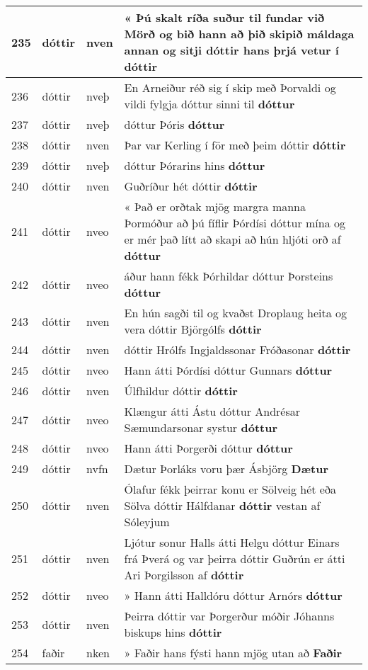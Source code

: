 \documentclass{article}
\begin{document}
\begin{longtable}{p{1cm}|p{1cm}|p{1cm}|p{13cm}}
\hline
235&dóttir&nven&« Þú skalt ríða suður til fundar við Mörð og bið hann að þið skipið máldaga annan og sitji dóttir hans þrjá vetur í \textbf{dóttir} \\
\hline
236&dóttir&nveþ&En Arneiður réð sig í skip með Þorvaldi og vildi fylgja dóttur sinni til \textbf{dóttur} \\
\hline
237&dóttir&nveþ&dóttur Þóris \textbf{dóttur} \\
\hline
238&dóttir&nven&Þar var Kerling í för með þeim dóttir \textbf{dóttir} \\
\hline
239&dóttir&nveþ&dóttur Þórarins hins \textbf{dóttur} \\
\hline
240&dóttir&nven&Guðríður hét dóttir \textbf{dóttir} \\
\hline
241&dóttir&nveo&« Það er orðtak mjög margra manna Þormóður að þú fíflir Þórdísi dóttur mína og er mér það lítt að skapi að hún hljóti orð af \textbf{dóttur} \\
\hline
242&dóttir&nveo&áður hann fékk Þórhildar dóttur Þorsteins \textbf{dóttur} \\
\hline
243&dóttir&nven&En hún sagði til og kvaðst Droplaug heita og vera dóttir Björgólfs \textbf{dóttir} \\
\hline
244&dóttir&nven&dóttir Hrólfs Ingjaldssonar Fróðasonar \textbf{dóttir} \\
\hline
245&dóttir&nveo&Hann átti Þórdísi dóttur Gunnars \textbf{dóttur} \\
\hline
246&dóttir&nven&Úlfhildur dóttir \textbf{dóttir} \\
\hline
247&dóttir&nveo&Klængur átti Ástu dóttur Andrésar Sæmundarsonar systur \textbf{dóttur} \\
\hline
248&dóttir&nveo&Hann átti Þorgerði dóttur \textbf{dóttur} \\
\hline
249&dóttir&nvfn&Dætur Þorláks voru þær Ásbjörg \textbf{Dætur} \\
\hline
250&dóttir&nven&Ólafur fékk þeirrar konu er Sölveig hét eða Sölva dóttir Hálfdanar \textbf{dóttir} vestan af Sóleyjum\\
\hline
251&dóttir&nven&Ljótur sonur Halls átti Helgu dóttur Einars frá Þverá og var þeirra dóttir Guðrún er átti Ari Þorgilsson af \textbf{dóttir} \\
\hline
252&dóttir&nveo&» Hann átti Halldóru dóttur Arnórs \textbf{dóttur} \\
\hline
253&dóttir&nven&Þeirra dóttir var Þorgerður móðir Jóhanns biskups hins \textbf{dóttir} \\
\hline
254&faðir&nken&» Faðir hans fýsti hann mjög utan að \textbf{Faðir} \\

\end{longtable}
\end{document}
